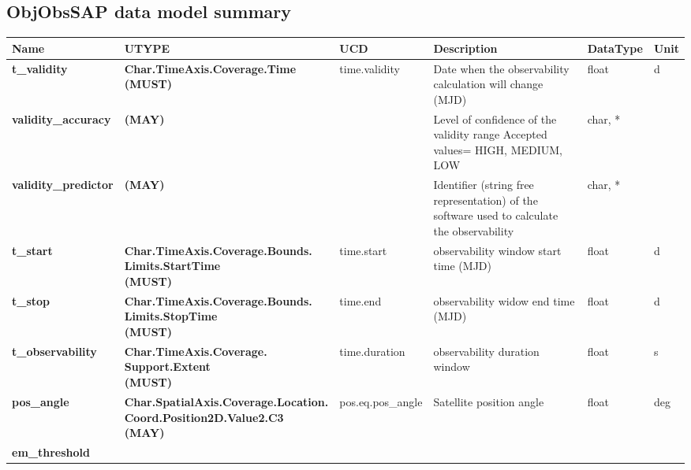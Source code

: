 \documentclass[11pt,a4paper]{ivoatex/ivoa}
\begin{document}
\begin{appendices}
\section{ObjObsSAP data model summary}
\FloatBarrier
\begin{table}[h]
\tiny
\centering
\begin{adjustbox}{angle=90}
\begin{tabular}{|p{25mm}|p{50mm}|p{20mm}|p{40mm}|p{15mm}|p{10mm}|}
\hline
Name & UTYPE & UCD & Description & DataType & Unit \\
\hline
\textbf{t\_validity} & \textbf{Char.TimeAxis.Coverage.Time  \newline
(MUST)} &
time.validity & Date when the \newline
observability calculation will change (MJD) &
float & d \\
\hline
\textbf{validity\_accuracy} & \textbf{(MAY)} & & Level of confidence
of the validity range \newline
Accepted values= HIGH, MEDIUM, LOW & char, * & \\
\hline
\textbf{validity\_predictor} & \textbf{(MAY)} & & Identifier (string
free representation) of the software used to calculate the observability &
char, * & \\
\hline
\textbf{t\_start} & \textbf{
Char.TimeAxis.Coverage.Bounds. \newline
Limits.StartTime  \newline
(MUST)} & time.start &
observability window start time (MJD) & float & d \\
\hline
\textbf{t\_stop} & \textbf{
Char.TimeAxis.Coverage.Bounds. \newline
Limits.StopTime \newline
(MUST)} & time.end &
observability widow end time (MJD) & float & d \\
\hline
\textbf{t\_observability} & \textbf{
Char.TimeAxis.Coverage. \newline
Support.Extent  \newline
(MUST)} & time.duration &
observability duration window & float & s \\
\hline
\textbf{pos\_angle} & \textbf{
Char.SpatialAxis.Coverage.Location. \newline
Coord.Position2D.Value2.C3  \newline
(MAY)} &
pos.eq.pos\_angle & Satellite position angle & float & deg \\
\hline
\textbf{em\_threshold} & \textbf{
}
\end{tabular}
\end{adjustbox}
\end{table}
\end{appendices}
\end{document}
